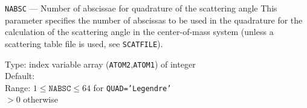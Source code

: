 \begin{keydescription}{\texttt{NABSC} --- Number of abscissae for quadrature
   of the scattering angle}
%
  This parameter specifies the number of abscissas to be used in the quadrature 
  for the calculation of the scattering angle in the center-of-mass system 
  (unless a scattering table file is used, see \texttt{SCATFILE}).
  \begin{keytab}
    Type:    \> index variable array (\texttt{ATOM2},\texttt{ATOM1}) 
                of integer \\
    Default:  \\
    Range:   \> $ 1 \le \texttt{NABSC} \le 64$ for \texttt{QUAD='Legendre'} \\
             \> $> 0$ otherwise
  \end{keytab}
\end{keydescription}

